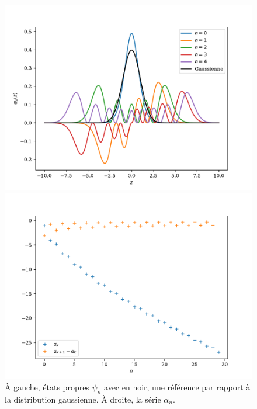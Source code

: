 \begin{figure}[h]
	\begin{minipage}[t]{0.5\linewidth}
        \includegraphics[width=\linewidth]{sosequi-laser/etats-laser.pdf}
	\end{minipage}%
	\begin{minipage}[t]{0.5\linewidth}
    	\includegraphics[width=\linewidth]{sosequi-laser/energies-laser.pdf}
	\end{minipage}
    \caption{À gauche, états propres $\psi_n$ avec en noir, une référence par rapport à la distribution gaussienne. À droite, la série $\alpha_n$.}
\end{figure}



